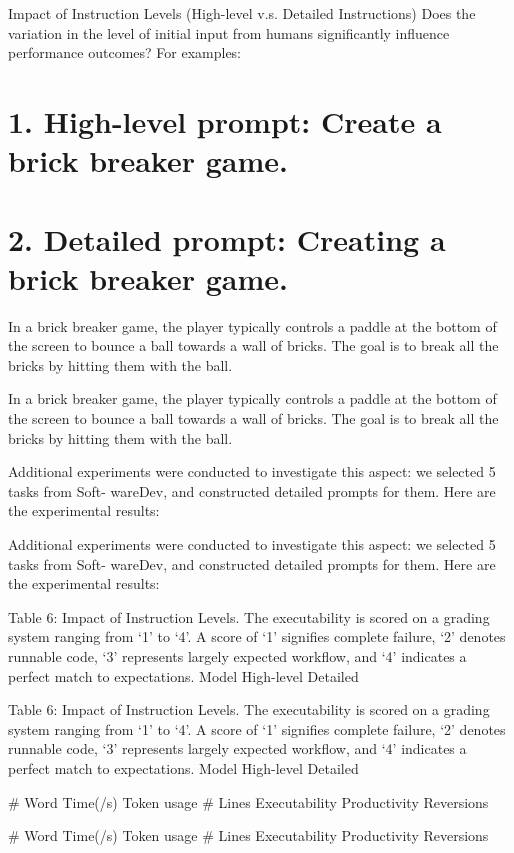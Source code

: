 \documentclass[12pt]{article}
\begin{document}
Impact of Instruction Levels (High-level v.s. Detailed Instructions) Does the variation in the
level of initial input from humans significantly influence performance outcomes? For examples:


\section{1. High-level prompt: Create a brick breaker game.}


\section{2. Detailed prompt: Creating a brick breaker game.}


In a brick breaker game, the player
typically controls a paddle at the bottom of the screen to bounce a ball towards a wall of
bricks. The goal is to break all the bricks by hitting them with the ball.


In a brick breaker game, the player
typically controls a paddle at the bottom of the screen to bounce a ball towards a wall of
bricks. The goal is to break all the bricks by hitting them with the ball.


Additional experiments were conducted to investigate this aspect: we selected 5 tasks from Soft-
wareDev, and constructed detailed prompts for them. Here are the experimental results:


Additional experiments were conducted to investigate this aspect: we selected 5 tasks from Soft-
wareDev, and constructed detailed prompts for them. Here are the experimental results:


Table 6: Impact of Instruction Levels. The executability is scored on a grading system ranging
from ‘1’ to ‘4’. A score of ‘1’ signifies complete failure, ‘2’ denotes runnable code, ‘3’ represents
largely expected workflow, and ‘4’ indicates a perfect match to expectations.
Model
High-level
Detailed


Table 6: Impact of Instruction Levels. The executability is scored on a grading system ranging
from ‘1’ to ‘4’. A score of ‘1’ signifies complete failure, ‘2’ denotes runnable code, ‘3’ represents
largely expected workflow, and ‘4’ indicates a perfect match to expectations.
Model
High-level
Detailed


# Word Time(/s) Token usage # Lines Executability Productivity Reversions


\# Word Time(/s) Token usage \# Lines Executability Productivity Reversions
\end{document}

